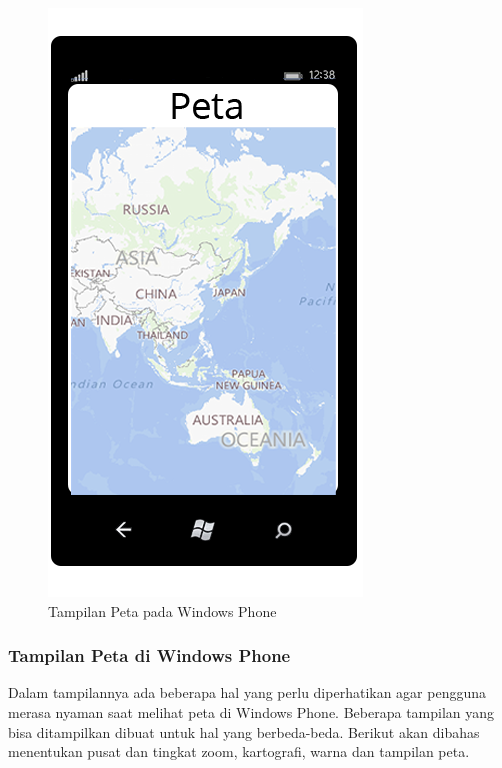 \clearpage

\begin{figure}[h]
	\centering
		\includegraphics[scale=0.1]{Gambar/map}
	\caption{Tampilan Peta pada Windows Phone}
	\label{fig:peta}
\end{figure}

\subsubsection{Tampilan Peta di Windows Phone}
\label{subsubsec:Tampilan Peta di Windows Phone}
\hspace{0.5cm} Dalam tampilannya ada beberapa hal yang perlu diperhatikan agar pengguna merasa nyaman saat melihat peta di Windows Phone. Beberapa tampilan yang bisa ditampilkan dibuat untuk hal yang berbeda-beda. Berikut akan dibahas menentukan pusat dan tingkat zoom, kartografi, warna dan tampilan peta.

